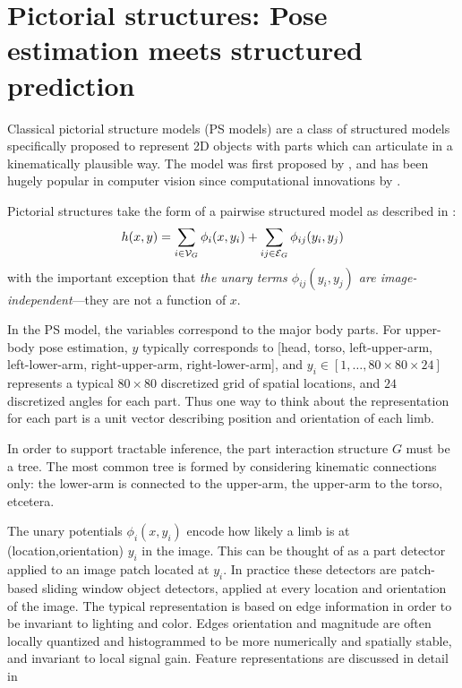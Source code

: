 \chapter{Pictorial structures: Pose estimation meets structured prediction} 
\label{ps}
Classical pictorial structure models (PS models) are a class of structured 
models specifically proposed to represent 2D objects with parts which can 
articulate in a kinematically plausible way.  The model was first proposed by 
\citet{fischler1973ps}, and has been hugely popular in computer vision since 
computational innovations by \citet{felz05}.

Pictorial structures take the form of a pairwise structured model as described 
in :
\begin{equation}
h(x,y) = \sum_{i \in \mathcal{V}_G} \phi_i(x,y_i) + \sum_{ij \in \mathcal{E}_G} 
\label{eq:standard-ps}
\phi_{ij}(y_i,y_j)
\end{equation}
with the important exception that {\em the unary terms $\phi_{ij}(y_i,y_j)$ are 
image-independent}---they are not a function of $x$.

In the PS model, the variables correspond to the major body parts.  For 
upper-body pose estimation, $y$ typically corresponds to [head, torso, 
left-upper-arm, left-lower-arm, right-upper-arm, right-lower-arm], and $y_i \in 
[1,\ldots,80\times 80 \times 24]$ represents a typical $80 \times 80$ 
discretized grid of spatial locations, and $24$ discretized angles for each 
part.  Thus one way to think about the representation for each part is a unit 
vector describing position and orientation of each limb. 

 In order to support tractable inference, the part 
interaction structure $G$ must be a tree.  The most common tree is formed by 
considering kinematic connections only: the lower-arm is connected to the 
upper-arm, the upper-arm to the torso, etcetera.

 The unary potentials $\phi_i(x,y_i)$ encode how likely a limb is 
at (location,orientation) $y_i$ in the image.  This can be thought of as a part 
detector applied to an image patch located at $y_i$.  In practice these 
detectors are patch-based sliding window object detectors, applied at every 
location and orientation of the image.  The typical representation is based on 
edge information in order to be invariant to lighting and color. Edges 
orientation and magnitude are often locally quantized and histogrammed to be 
more numerically and spatially stable, and invariant to local signal gain.  
Feature representations are discussed in detail in 

